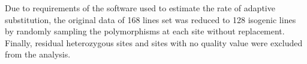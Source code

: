 Due to requirements of the software used to estimate the rate of adaptive substitution, 
the original data of 168 lines set was reduced to 128 isogenic lines by randomly sampling the polymorphisms at each site without replacement. Finally, residual heterozygous sites and sites with no quality value were excluded from the analysis.





